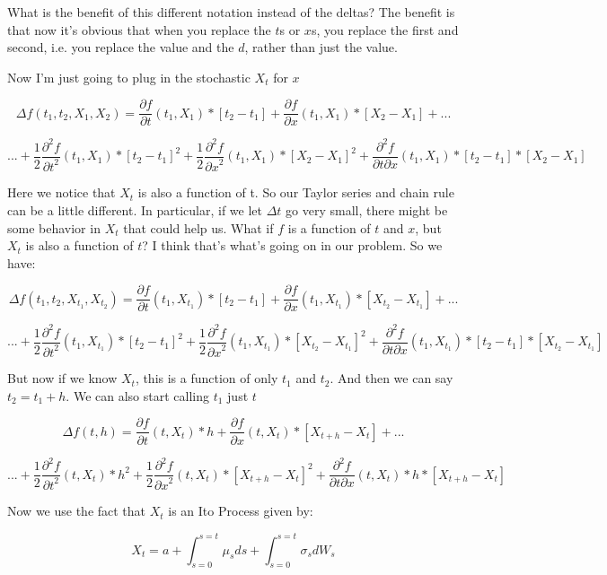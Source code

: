 \documentclass{article}
\begin{document}
What is the benefit of this different notation instead of the deltas? The benefit is that now it's obvious that when you replace the $t$s or $x$s, you replace the first and second, i.e. you replace the value and the $d$, rather than just the value. 

Now I'm just going to plug in the stochastic $X_t$ for $x$

$$\Delta f(t_1,t_2,X_1,X_2) = \frac{\partial f}{\partial t}(t_1,X_1) *[t_2-t_1] + \frac{\partial f}{\partial x}(t_1,X_1) *[X_2-X_1]  + ... $$

$$... +  \frac{1}{2}\frac{\partial^2 f}{{\partial t}^2}(t_1,X_1) * {[t_2-t_1]}^2 + \frac{1}{2}\frac{\partial^2 f}{{\partial x}^2}(t_1,X_1) * {[X_2-X_1]}^2 +  \frac{\partial^2 f}{\partial t \partial x}(t_1,X_1) *[t_2-t_1]*[X_2-X_1]$$

Here we notice that $X_t$ is also a function of t. So our Taylor series and chain rule can be a little different.  In particular, if we let $\Delta t$ go very small, there might be some behavior in $X_t$ that could help us. What if $f$ is a function of $t$ and $x$, but $X_t$ is also a function of $t$? I think that's what's going on in our problem.  So we have:

$$\Delta f(t_1,t_2,X_{t_1},X_{t_2}) = \frac{\partial f}{\partial t}(t_1,X_{t_1}) *[t_2-t_1] + \frac{\partial f}{\partial x}(t_1,X_{t_1}) *[X_{t_2}-X_{t_1}]  + ... $$

$$... +  \frac{1}{2}\frac{\partial^2 f}{{\partial t}^2}(t_1,X_{t_1}) * {[t_2-t_1]}^2 + \frac{1}{2}\frac{\partial^2 f}{{\partial x}^2}(t_1,X_{t_1}) * {[X_{t_2}-X_{t_1}]}^2 +  \frac{\partial^2 f}{\partial t \partial x}(t_1,X_{t_1}) *[t_2-t_1]*[X_{t_2}-X_{t_1}]$$

But now if we know $X_t$, this is a function of only $t_1$ and $t_2$.  And then we can say $t_2 = t_1 + h$. We can also start calling $t_1$ just $t$

$$\Delta f(t,h) = \frac{\partial f}{\partial t}(t,X_{t}) *h + \frac{\partial f}{\partial x}(t,X_{t}) *[X_{t+h}-X_{t}]  + ... $$

$$... +  \frac{1}{2}\frac{\partial^2 f}{{\partial t}^2}(t,X_{t}) * {h}^2 + \frac{1}{2}\frac{\partial^2 f}{{\partial x}^2}(t,X_{t}) * {[X_{t+h}-X_{t}]}^2 +  \frac{\partial^2 f}{\partial t \partial x}(t,X_{t}) *h*[X_{t+h}-X_{t}]$$

Now we use the fact that $X_t$ is an Ito Process given by:

$$X_t = a + \int_{s=0}^{s=t} \mu_sds + \int_{s=0}^{s=t} \sigma_sdW_s$$
\end{document}
